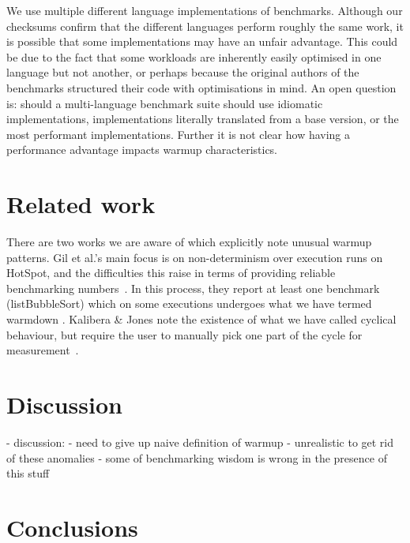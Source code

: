 \documentclass[10pt,preprint]{sigplanconf}
\newcommand{\kalibera}{Kalibera \& Jones\xspace}
\begin{document}
We use multiple different language implementations of benchmarks. Although our
checksums confirm that the different languages perform roughly the same work,
it is possible that some implementations may have an unfair advantage. This
could be due to the fact that some workloads are inherently easily optimised in
one language but not another, or perhaps because the original authors of the
benchmarks structured their code with optimisations in mind. An open question
is: should a multi-language benchmark suite should use idiomatic
implementations, implementations literally translated from a base version, or
the most performant implementations. Further it is not clear how having a
performance advantage impacts warmup characteristics.





\section{Related work}

There are two works we are aware of which explicitly note unusual warmup
patterns. Gil et al.'s main focus is on non-determinism over execution runs on
HotSpot, and the difficulties this raise in terms of providing reliable
benchmarking numbers~\cite{gil11microbenchmark}. In this process, they report at
least one benchmark (listBubbleSort) which on some executions undergoes what we
have termed warmdown . \kalibera note the
existence of what we have called cyclical behaviour, but require the user to
manually pick one part of the cycle for measurement~\cite{kalibera13rigorous}.


\section{Discussion}
\label{sec:Discussion}

  - discussion:
    - need to give up naive definition of warmup
    - unrealistic to get rid of these anomalies
    - some of benchmarking wisdom is wrong in the presence of this stuff

\section{Conclusions}
\label{sec:conclusion}



\end{document}
